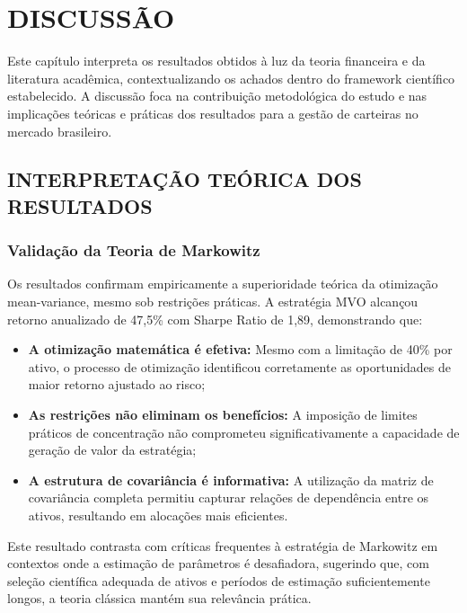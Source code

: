 
\chapter{DISCUSSÃO}

Este capítulo interpreta os resultados obtidos à luz da teoria financeira e da literatura acadêmica, contextualizando os achados dentro do framework científico estabelecido. A discussão foca na contribuição metodológica do estudo e nas implicações teóricas e práticas dos resultados para a gestão de carteiras no mercado brasileiro.

\section{INTERPRETAÇÃO TEÓRICA DOS RESULTADOS}

\subsection{Validação da Teoria de Markowitz}

Os resultados confirmam empiricamente a superioridade teórica da otimização mean-variance, mesmo sob restrições práticas. A estratégia MVO alcançou retorno anualizado de 47,5\% com Sharpe Ratio de 1,89, demonstrando que:

\begin{itemize}
    \item \textbf{A otimização matemática é efetiva:} Mesmo com a limitação de 40\% por ativo, o processo de otimização identificou corretamente as oportunidades de maior retorno ajustado ao risco;
    
    \item \textbf{As restrições não eliminam os benefícios:} A imposição de limites práticos de concentração não comprometeu significativamente a capacidade de geração de valor da estratégia;
    
    \item \textbf{A estrutura de covariância é informativa:} A utilização da matriz de covariância completa permitiu capturar relações de dependência entre os ativos, resultando em alocações mais eficientes.
\end{itemize}

Este resultado contrasta com críticas frequentes à estratégia de Markowitz em contextos onde a estimação de parâmetros é desafiadora, sugerindo que, com seleção científica adequada de ativos e períodos de estimação suficientemente longos, a teoria clássica mantém sua relevância prática.

